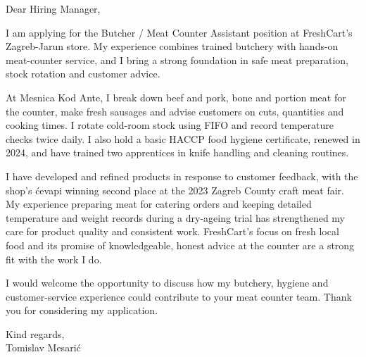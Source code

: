 \documentclass[11pt,a4paper]{article}
\begin{document}
Dear Hiring Manager,

I am applying for the Butcher / Meat Counter Assistant position at FreshCart's Zagreb-Jarun store. My experience combines trained butchery with hands-on meat-counter service, and I bring a strong foundation in safe meat preparation, stock rotation and customer advice.

At Mesnica Kod Ante, I break down beef and pork, bone and portion meat for the counter, make fresh sausages and advise customers on cuts, quantities and cooking times. I rotate cold-room stock using FIFO and record temperature checks twice daily. I also hold a basic HACCP food hygiene certificate, renewed in 2024, and have trained two apprentices in knife handling and cleaning routines.

I have developed and refined products in response to customer feedback, with the shop's ćevapi winning second place at the 2023 Zagreb County craft meat fair. My experience preparing meat for catering orders and keeping detailed temperature and weight records during a dry-ageing trial has strengthened my care for product quality and consistent work. FreshCart's focus on fresh local food and its promise of knowledgeable, honest advice at the counter are a strong fit with the work I do.

I would welcome the opportunity to discuss how my butchery, hygiene and customer-service experience could contribute to your meat counter team. Thank you for considering my application.

Kind regards,\\
Tomislav Mesarić
\end{document}
